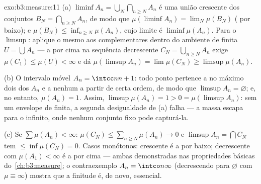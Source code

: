 \begin{solution}{exo:b3:measure:11}
(a) $\liminf A_n = \bigcup_N\bigcap_{n\geq N}A_n$ é uma
união crescente dos conjuntos $B_N = \bigcap_{n\geq N}A_n$,
de modo que $\mu(\liminf A_n) = \lim_N\mu(B_N)$ ( por
baixo); e $\mu(B_N) \leq \inf_{n \geq N}\mu(A_n)$, cujo
limite é $\liminf\mu(A_n)$. Para o $\limsup$: aplique o
mesmo aos complementares dentro do ambiente de  finita
$U = \bigcup A_n$ --- a  por cima na sequência
decrescente $C_N = \bigcup_{n\geq N}A_n$ exige $\mu(C_1)
\leq \mu(U) < \infty$ e dá $\mu(\limsup A_n) =
\lim\mu(C_N) \geq \limsup\mu(A_n)$.

(b) O intervalo móvel $A_n = \intcc n{n+1}$: todo ponto
pertence a no máximo dois dos $A_n$ e a nenhum a partir de certa ordem,
de modo que $\limsup A_n = \varnothing$; e, no entanto, $\mu(A_n) = 1$. Assim,
$\limsup\mu(A_n) = 1 > 0 = \mu(\limsup A_n)$: sem um envelope
de  finita, a segunda desigualdade de (a) falha
--- a massa escapa para o infinito, onde nenhum conjunto fixo pode
capturá-la.

(c) Se $\sum\mu(A_n) < \infty$: $\mu(C_N) \leq
\sum_{n\geq N}\mu(A_n) \to 0$ e $\limsup A_n =
\bigcap C_N$ tem  $\leq \inf\mu(C_N) = 0$. Casos
monótonos: crescente é a  por baixo; decrescente com
$\mu(A_1) < \infty$ é a  por cima ---
ambas demonstradas nas propriedades básicas do~\cref{ch:b3:measure}; o
contraexemplo $A_n = \intco n\infty$ (decrescendo para
$\varnothing$ com $\mu \equiv \infty$) mostra que a finitude
é, de novo, essencial.
\end{solution}


